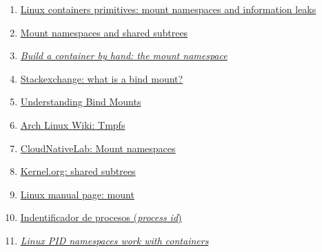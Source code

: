 \documentclass[a4paper, oneside, 12pt]{book}
\begin{document}
\begin{enumerate}
		\item
		\label{bib: mount namespace info 1}
		\href{https://www.schutzwerk.com/en/43/posts/namespaces_02_mnt/}{Linux containers primitives: mount namespaces and information leaks}
		
		\item
		\label{bib: mount namespace info 2}
		\href{https://lwn.net/Articles/689856/}{Mount namespaces and shared subtrees}
		
		\item
		\label{bib: mount namespace redhat} \href{https://www.redhat.com/sysadmin/mount-namespaces}{\textit{Build a container by hand: the mount namespace}}
		
		\item 
		\label{bib: what is bind}
		\href{https://unix.stackexchange.com/questions/198590/what-is-a-bind-mount}{Stackexchange: what is a bind mount?}
		
		\item
		\label{bib: mount bind}
		\href{https://www.baeldung.com/linux/bind-mounts}{Understanding Bind Mounts}
		
		\item
		\label{bib: tmpfs arch linux}
		\href{https://wiki.archlinux.org/title/Tmpfs}{Arch Linux Wiki: Tmpfs}
		
		\item
		\label{bib: mount namespaces containerlabs}
		\href{https://www.containerlabs.kubedaily.com/LXC/Linux%20Containers/Mount-namespaces.html}{CloudNativeLab: Mount namespaces}
		
		\item
		\label{bib: mount namespaces shared subtree}
		\href{https://www.kernel.org/doc/Documentation/filesystems/sharedsubtree.txt}{Kernel.org: shared subtrees}
		
		\item
		\label{bib: mount namespaces shared subtree 2}
		\href{https://man7.org/linux/man-pages/man8/mount.8.html}{Linux manual page: mount}
		
		\item
		\label{bib:pid wikipedia}
		\href{https://en.wikipedia.org/wiki/Process_identifier}{Indentificador de procesos (\textit{process id})}
		
		\item
		\label{bib:link9}
		\href{https://www.redhat.com/sysadmin/linux-pid-namespaces}{\textit{Linux PID namespaces work with containers}}
		

\end{enumerate}
\end{document}
